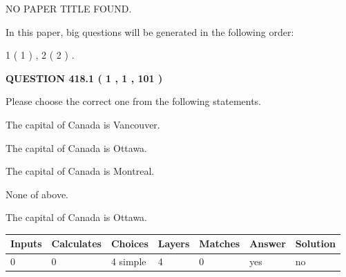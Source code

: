 \documentclass[12pt]{article}
\begin{document}
   
\vspace{0.2in}
   
   
   
   
   
   
 NO PAPER TITLE FOUND.
   
   
   
\vspace{0.2in}
   
In this paper, big questions will be generated in the following order: 
   
   
   1 ( 1 )
 ,
   2 ( 2 )
 .
  
\vspace{0.2in}
  
{\textbf{\Large{QUESTION
418.1 
 ( 1 , 1 , 101 )
}}}
  
  
Please choose the correct one from the following statements.
 
 
The capital of Canada is Vancouver.
 
 
The capital of Canada is Ottawa.
 
 
The capital of Canada is Montreal.
 
 
 None of above.
 
 
\noindent{}
 
 
The capital of Canada is Ottawa.
 
 
\noindent{}
 
 
   
   
   
   
\noindent\begin{tabular}{|l|l|l|l|l|l|l|}
 \hline
Inputs & Calculates & Choices & Layers & Matches & Answer & Solution \\ \hline
 0  & 
 0  & 
 4
  simple  
  & 
 4  & 
 0  & 
  yes & 
  no 
  \\ \hline
 \end{tabular}
   
   
   
   
\noindent{}
   
   
   
\end{document}
